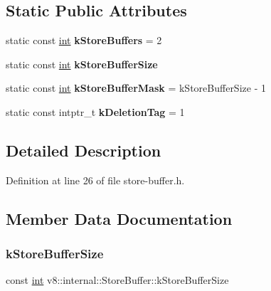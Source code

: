 \subsection*{Static Public Attributes}
\begin{DoxyCompactItemize}
\item 
\mbox{\label{classv8_1_1internal_1_1StoreBuffer_a0b3fa42e0a43ad96585345a1aab4b751}} 
static const \mbox{\hyperlink{classint}{int}} {\bfseries k\+Store\+Buffers} = 2
\item 
static const \mbox{\hyperlink{classint}{int}} {\bfseries k\+Store\+Buffer\+Size}
\item 
\mbox{\label{classv8_1_1internal_1_1StoreBuffer_aba773520960e5bb924b2da224136f597}} 
static const \mbox{\hyperlink{classint}{int}} {\bfseries k\+Store\+Buffer\+Mask} = k\+Store\+Buffer\+Size -\/ 1
\item 
\mbox{\label{classv8_1_1internal_1_1StoreBuffer_a9fc0b0ab94a4aa1089bda69810937045}} 
static const intptr\+\_\+t {\bfseries k\+Deletion\+Tag} = 1
\end{DoxyCompactItemize}


\subsection{Detailed Description}


Definition at line 26 of file store-\/buffer.\+h.



\subsection{Member Data Documentation}
\mbox{\label{classv8_1_1internal_1_1StoreBuffer_ad1e8d91749d99db471ce7f75ddc6dbfc}} 
\subsubsection{\texorpdfstring{k\+Store\+Buffer\+Size}{kStoreBufferSize}}
{\footnotesize\ttfamily const \mbox{\hyperlink{classint}{int}} v8\+::internal\+::\+Store\+Buffer\+::k\+Store\+Buffer\+Size\hspace{0.3cm}{\ttfamily [static]}}

